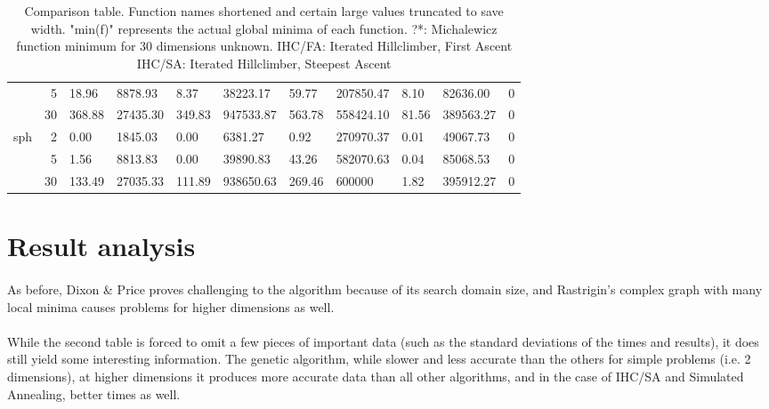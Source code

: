 \documentclass{article}
\begin{document}
\begin{table}[!h]
{\begin{tabular}{rr|llllllll|l}
                                        & 5                  & 18.96        & 8878.93     & 8.37        & 38223.17     & 59.77           & 207850.47        & 8.10        & 82636.00      & 0                       \\
                                        & 30                 & 368.88       & 27435.30    & 349.83      & 947533.87    & 563.78          & 558424.10        & 81.56       & 389563.27     & 0                       \\
        \multirow{3}{*}{sph}         & 2                  & 0.00         & 1845.03     & 0.00        & 6381.27      & 0.92            & 270970.37        & 0.01        & 49067.73      & 0                       \\
                                        & 5                  & 1.56         & 8813.83     & 0.00        & 39890.83     & 43.26           & 582070.63        & 0.04        & 85068.53      & 0                       \\
                                        & 30                 & 133.49       & 27035.33    & 111.89      & 938650.63    & 269.46          & 600000     & 1.82        & 395912.27     & 0                      
        \end{tabular}
        }
        \caption{Comparison table. Function names shortened and certain large values truncated to save width. "min(f)" represents the actual global minima of each function.
        \newline
        ?*: Michalewicz function minimum for 30 dimensions unknown.
        \newline
        IHC/FA: Iterated Hillclimber, First Ascent
        \newline
        IHC/SA: Iterated Hillclimber, Steepest Ascent}
    \end{table}

    \section{Result analysis}
    \paragraph{}
    As before, Dixon \& Price proves challenging to the algorithm because of its search domain size, and Rastrigin's complex graph with many local minima causes problems for higher dimensions as well. 
    \paragraph{}
    While the second table is forced to omit a few pieces of important data (such as the standard deviations of the times and results), it does still yield some interesting information. The genetic algorithm, while slower and less accurate than the others for simple problems (i.e. 2 dimensions), at higher dimensions it produces more accurate data than all other algorithms, and in the case of IHC/SA and Simulated Annealing, better times as well.
\end{document}
